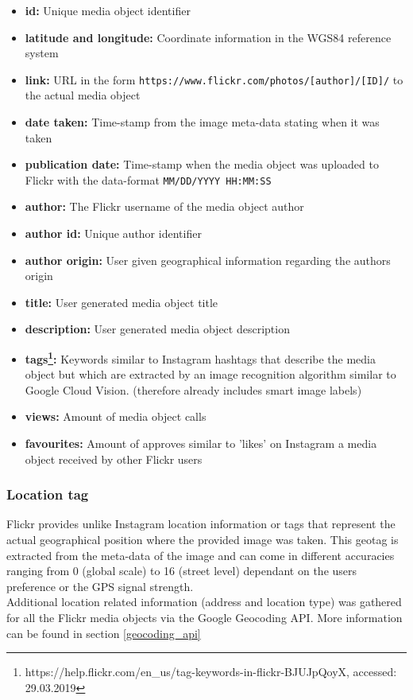 \begin{itemize}[label={}]
    \item \textbf{id:} Unique media object identifier 
    \item \textbf{latitude and longitude:} Coordinate information in the WGS84 reference system 
    \item \textbf{link:} URL in the form \texttt{https://www.flickr.com/photos/[author]/[ID]/} to the actual media object 
    \item \textbf{date taken:} Time-stamp from the image meta-data stating when it was taken 
    \item \textbf{publication date:} Time-stamp when the media object was uploaded to Flickr with the data-format \texttt{MM/DD/YYYY HH:MM:SS} 
    \item \textbf{author:} The Flickr username of the media object author 
    \item \textbf{author id:} Unique author identifier  
    \item \textbf{author origin:} User given geographical information regarding the authors origin 
    \item \textbf{title:} User generated media object title 
    \item \textbf{description:} User generated media object description 
    \item \textbf{tags\footnote{https://help.flickr.com/en\_us/tag-keywords-in-flickr-BJUJpQoyX, accessed: 29.03.2019}:} Keywords similar to Instagram hashtags that describe the media object but which are extracted by an image recognition algorithm similar to Google Cloud Vision. (therefore already includes smart image labels) 
    \item \textbf{views:} Amount of media object calls 
    \item \textbf{favourites:} Amount of approves similar to 'likes' on Instagram a media object received by other Flickr users 
\end{itemize}

\subsubsection*{Location tag} \label{flickr_location_tag}
Flickr provides unlike Instagram location information or tags that represent the actual geographical position where the provided image was taken. This geotag is extracted from the meta-data of the image and can come in different accuracies ranging from 0 (global scale) to 16 (street level) dependant on the users preference or the GPS signal strength. \\
Additional location related information (address and location type) was gathered for all the Flickr media objects via the Google Geocoding API. More information can be found in section \ref{geocoding_api}

